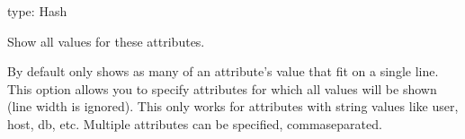 \documentclass[letterpaper,10pt,english]{sphinxmanual}
\begin{document}
\begin{fulllineitems}
\label{\detokenize{mariadb-query-digest:cmdoption-mariadb-query-digest-show-all}}
\sphinxAtStartPar
type: Hash

\sphinxAtStartPar
Show all values for these attributes.

\sphinxAtStartPar
By default  only shows as many of an attribute’s value that
fit on a single line.  This option allows you to specify attributes for which
all values will be shown (line width is ignored).  This only works for
attributes with string values like user, host, db, etc.  Multiple attributes
can be specified, comma\sphinxhyphen{}separated.

\end{fulllineitems}

\end{document}
